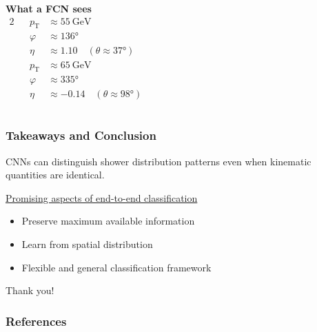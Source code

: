 \documentclass[14pt, t]{beamer}
\begin{document}
\begin{frame}
{\begin{columns}
        {\centering \textbf{What a FCN sees}}
        \vspace{3mm}
        \begin{alignat*}{2}
            && p_{\text{T}} & \approx \SI{55}{\giga \electronvolt}\\
            && \varphi & \approx \ang{136} \\
            && \eta & \approx 1.10 \quad (\theta \approx \ang{37}) \\[16mm]
            && p_{\text{T}} & \approx \SI{65}{\giga \electronvolt}\\
            && \varphi & \approx \ang{335} \\
            && \eta & \approx -0.14 \quad (\theta \approx \ang{98})
        \end{alignat*} 
    \end{columns}}

\end{frame}

\begin{frame}
    \frametitle{Takeaways and Conclusion}

    \begin{center}
        CNNs can distinguish shower distribution patterns even when kinematic quantities are identical.
    \end{center}
    \underline{Promising aspects of end-to-end classification}
    \vspace{1mm}
    \begin{itemize}
    
        \item Preserve maximum available information
        \vspace{0.5mm}

        \item Learn from spatial distribution
        \vspace{0.5mm}

        \item Flexible and general classification framework 
    
    \end{itemize}

    \pause
    \vspace{2mm}
    \begin{center}
        \Large{Thank you!}
    \end{center}
    
\end{frame}

\begin{frame}
    \frametitle{References}
    \printbibliography
\end{frame}
\end{document}
